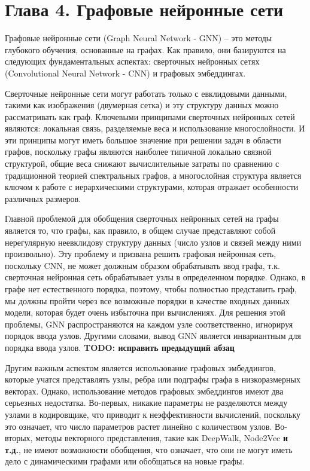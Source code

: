 \section{Глава 4. Графовые нейронные сети}
Графовые нейронные сети (Graph Neural Network - GNN) -- это методы глубокого обучения, основанные на графах. Как правило, они базируются на следующих фундаментальных аспектах: сверточных нейронных сетях (Convolutional Neural Network - CNN) и графовых эмбеддингах. 

Сверточные нейронные сети могут работать только с евклидовыми данными, такими как изображения (двумерная сетка) и эту структуру данных можно рассматривать как граф. Ключевыми принципами сверточных нейронных сетей являются: локальная связь, разделяемые веса и использование многослойности. И эти принципы могут иметь большое значение при решении задач в области графов, поскольку графы являются наиболее типичной локально связной структурой, общие веса снижают вычислительные затраты по сравнению с традиционной теорией спектральных графов, а многослойная структура является ключом к работе с иерархическими структурами, которая отражает особенности различных размеров. 

Главной проблемой для обобщения сверточных нейронных сетей на графы является то, что графы, как правило, в общем случае представляют собой нерегулярную неевклидову структуру данных (число узлов и связей между ними произвольно). Эту проблему и призвана решить графовая нейронная сеть, поскольку CNN, не может должным образом обрабатывать ввод графа, т.к. сверточная нейронная сеть обрабатывает  узлы в определенном порядке. Однако, в графе нет естественного порядка, поэтому, чтобы полностью представить граф, мы должны пройти через все возможные порядки в качестве входных данных модели, которая будет очень избыточна при вычислениях. Для решения этой проблемы, GNN распространяются на каждом узле соответственно, игнорируя порядок ввода узлов. Другими словами, вывод GNN является инвариантным для порядка ввода узлов. 
\textbf{TODO: исправить предыдущий абзац}

Другим важным аспектом является использование графовых эмбеддингов, которые учатся представлять узлы, ребра или подграфы графа в низкоразмерных векторах. Однако, использование методов графовых эмбеддингов имеют два серьезных недостатка. Во-первых, никакие параметры не разделяются между узлами в кодировщике, что приводит к неэффективности вычислений, поскольку это означает, что число параметров растет линейно с количеством узлов. Во-вторых, методы векторного представления, такие как DeepWalk, Node2Vec \textbf{и т.д.}, не имеют возможности обобщения, что означает, что они не могут иметь дело с динамическими графами или обобщаться на новые графы.

